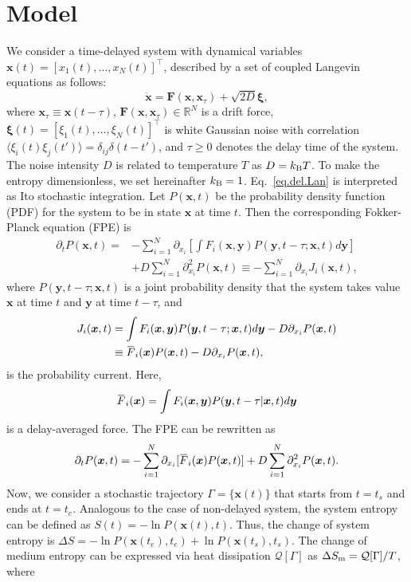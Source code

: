 \documentclass[pre,
twocolumn,
]{revtex4-1}
\newcommand{\overbar}[1]{\mkern 1.5mu\overline{\mkern-1.5mu#1\mkern-1.5mu}\mkern 1.5mu}
\theoremstyle{definition}
\theoremstyle{definition}
\newcommand{\bol}{\boldsymbol}
\newcommand{\mca}{\mathcal}
\newcommand{\mbb}{\mathbb}
\newcommand{\eq}[1]{\begin{equation}#1\end{equation}}
\newcommand{\al}[1]{\begin{align}#1\end{align}}
\newcommand{\als}[1]{\begin{align*}#1\end{align*}}
\newcommand{\avg}[1]{\langle #1\rangle}
\newcommand{\inl}[1]{$ #1 $}
\newcommand{\bras}[1]{\left[ #1 \right]}
\begin{document}
\section{Model}\label{sect.2}
We consider a time-delayed system with dynamical variables \inl{\bol{x}(t)=[x_1(t),\dots,x_N(t)]^\top}, described by a set of coupled Langevin equations as follows:
\eq{
\dot{\bol{x}} = \bol{F}(\bol{x},\bol{x}_\tau)+\sqrt{2D}\bol{\xi},\label{eq.del.Lan}
}
where \inl{\bol{x}_\tau\equiv\bol{x}(t-\tau)}, \inl{\bol{F}(\bol{x},\bol{x}_\tau)\in\mbb{R}^N} is a drift force, \inl{\bol{\xi}(t)=[\xi_1(t),\dots,\xi_N(t)]^\top} is white Gaussian noise with correlation \inl{\avg{\xi_i(t)\xi_j(t')}=\delta_{ij}\delta(t-t')}, and \inl{\tau\ge 0} denotes the delay time of the system.
The noise intensity \inl{D} is related to temperature \inl{T} as \inl{D=k_{\rm B}T}.
To make the entropy dimensionless, we set hereinafter \inl{k_{\rm B}=1}.
Eq.~\eqref{eq.del.Lan} is interpreted as Ito stochastic integration.
Let \inl{P(\bol{x},t)} be the probability density function (PDF) for the system to be in state \inl{\bol{x}} at time \inl{t}.
Then the corresponding Fokker-Planck equation (FPE) is \cite{Frank.2003.PRE,Frank.2005.PRE}
\al{
\partial_t P(\bol{x},t)=&-\sum_{i=1}^N\partial_{x_i}\bras{\int F_i(\bol{x},\bol{y}) P(\bol{y},t-\tau;\bol{x},t)d\bol{y}}\nonumber\\
&+D\sum_{i=1}^N\partial_{x_i}^2P(\bol{x},t)\equiv -\sum_{i=1}^N\partial_{x_i}J_i(\bol{x},t),
}
where \inl{P(\bol{y},t-\tau;\bol{x},t)} is a joint probability density that the system takes value \inl{\bol{x}} at time \inl{t} and \inl{\bol{y}} at time \inl{t-\tau}, and
\als{
J_i(\bol{x},t) &=\int F_i(\bol{x},\bol{y})P(\bol{y}, t-\tau;\bol{x},t)d\bol{y}-D\partial_{x_i}P(\bol{x},t)\\
&\equiv \overbar{F}_i(\bol{x}) P(\bol{x},t) - D\partial_{x_i}P(\bol{x},t),
}
is the probability current. Here,
\eq{
\overbar{F}_i(\bol{x}) = \int F_i(\bol{x},\bol{y})P(\bol{y},t-\tau |\bol{x},t)d\bol{y}
}
is a delay-averaged force.
The FPE can be rewritten as
\eq{
\partial_tP(\bol{x},t) =-\sum_{i=1}^N\partial_{x_i}[\overbar{F}_i(\bol{x})P(\bol{x},t)] + D\sum_{i=1}^N\partial_{x_i}^2P(\bol{x},t).\label{eq.FokPla.equ}
}
Now, we consider a stochastic trajectory \inl{\Gamma=\{\bol{x}(t)\}} that starts from \inl{t=t_s} and ends at \inl{t=t_e}.
Analogous to the case of non-delayed system, the system entropy can be defined as \inl{S(t)=-\ln P(\bol{x}(t),t)}.
Thus, the change of system entropy is \inl{\Delta S=-\ln{P(\bol{x}(t_e),t_e)}+\ln{P(\bol{x}(t_s),t_s)}}.
The change of medium entropy can be expressed via heat dissipation \inl{\mca{Q}[\Gamma]} as \inl{\Delta S_{\rm m}=\mca{Q}[\Gamma]/T}, where 
\end{document}

